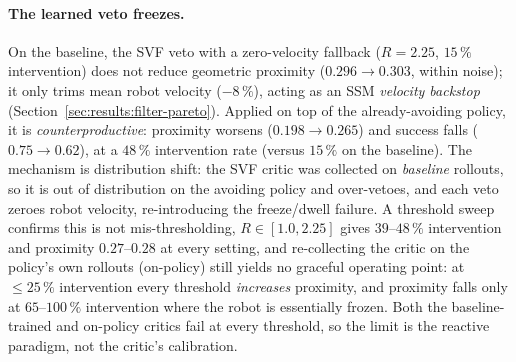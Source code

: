 \documentclass[11pt,a4paper]{report}
\newcommand{\ssm}{SSM}
\begin{document}
\paragraph{The learned veto freezes.}
On the baseline, the SVF veto with a zero-velocity fallback
($R = 2.25$, $15\,\%$ intervention) does not reduce geometric proximity
($0.296 \rightarrow 0.303$, within noise); it only trims mean robot
velocity ($-8\,\%$), acting as an \ssm{} \emph{velocity backstop}
(Section~\ref{sec:results:filter-pareto}). Applied on top of the
already-avoiding policy, it is \emph{counterproductive}: proximity
worsens ($0.198 \rightarrow 0.265$) and success falls
($0.75 \rightarrow 0.62$), at a $48\,\%$ intervention rate (versus
$15\,\%$ on the baseline). The mechanism is distribution shift: the SVF
critic was collected on \emph{baseline} rollouts, so it is out of
distribution on the avoiding policy and over-vetoes, and each veto
zeroes robot velocity, re-introducing the freeze/dwell failure. A
threshold sweep confirms this is not mis-thresholding, $R \in [1.0,
2.25]$ gives $39$--$48\,\%$ intervention and proximity $0.27$--$0.28$ at
every setting, and re-collecting the critic on the policy's own
rollouts (on-policy) still yields no graceful operating point: at
$\le 25\,\%$ intervention every threshold \emph{increases} proximity,
and proximity falls only at $65$--$100\,\%$ intervention where the robot
is essentially frozen. Both the baseline-trained and on-policy critics
fail at every threshold, so the limit is the reactive paradigm, not the
critic's calibration.
\end{document}
